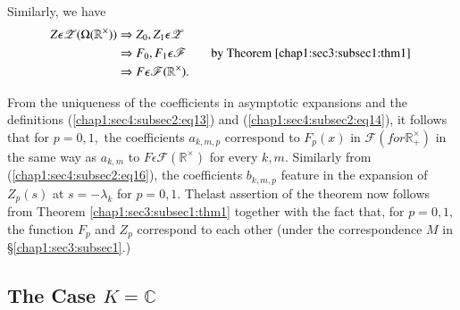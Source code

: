Similarly, we have
\begin{align*}
  Z\epsilon\mathscr{Z}(\Omega(\mathbb{R}^\times)) & \Rightarrow
  Z_0,Z_1\epsilon \mathscr{Z}\\
  & \Rightarrow
  F_0,F_1\epsilon \mathscr{F} \qquad \text{by
    Theorem \ref{chap1:sec3:subsec1:thm1} }\\
  & \Rightarrow F\epsilon
  \mathscr{F}(\mathbb{R}^\times).  
\end{align*}

From the uniqueness of the coefficients in asymptotic expansions and
the definitions (\ref{chap1:sec4:subsec2:eq13}) and
(\ref{chap1:sec4:subsec2:eq14}), it follows that for $p=0,1,$ the
coefficients $a_{k,m,p}$ correspond to $F_{p}(x)$ in
$\mathscr{F}$$(for \mathbb{R}_+^\times)$ in the same way as $a_{k,m}$ to
$F\epsilon\mathscr{F}(\mathbb{R}^\times)$ for every $k,m.$ Similarly from
(\ref{chap1:sec4:subsec2:eq16}), the coefficients $b_{k,m,p}$ feature in the expansion of
$Z_p(s)$ at $s=-\lambda_k$ for $p=0,1$. The\pageoriginale last assertion of the
theorem now follows from Theorem \ref{chap1:sec3:subsec1:thm1} together with the fact that,
for $p=0,1,$ the function $F_p$ and $Z_p$ correspond to each other
(under the correspondence $M$ in \S \ref{chap1:sec3:subsec1}.) 

\subsection{The Case $K=\mathbb{C}$}\label{chap1:sec4:subsec3} %

